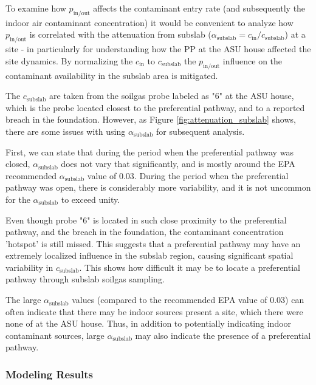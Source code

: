 \documentclass[journal=esthag,manuscript=article]{achemso}
\begin{document}
To examine how $p_\mathrm{in/out}$ affects the contaminant entry rate (and subsequently the indoor air contaminant concentration) it would be convenient to analyze how $p_\mathrm{in/out}$ is correlated with the attenuation from subslab ($\alpha_\mathrm{subslab} = c_\mathrm{in}/c_\mathrm{subslab}$) at a site - in particularly for understanding how the PP at the ASU house affected the site dynamics.
By normalizing the $c_\mathrm{in}$ to $c_\mathrm{subslab}$ the $p_\mathrm{in/out}$ influence on the contaminant availability in the subslab area is mitigated.

The $c_\mathrm{subslab}$ are taken from the soilgas probe labeled as "6" at the ASU house, which is the probe located closest to the preferential pathway, and to a reported breach in the foundation\cite{guo_identification_2015}.
However, as Figure \ref{fig:attenuation_subslab} shows, there are some issues with using $\alpha_\mathrm{subslab}$ for subsequent analysis.

First, we can state that during the period when the preferential pathway was closed, $\alpha_\mathrm{subslab}$ does not vary that significantly, and is mostly around the EPA recommended $\alpha_\mathrm{subslab}$ value of 0.03\cite{u.s._environmental_protection_agency_oswer_2015}.
During the period when the preferential pathway was open, there is considerably more variability, and it is not uncommon for the $\alpha_\mathrm{subslab}$ to exceed unity.

Even though probe "6" is located in such close proximity to the preferential pathway, and the breach in the foundation, the contaminant concentration 'hotspot' is still missed.
This suggests that a preferential pathway may have an extremely localized influence in the subslab region, causing significant spatial variability in $c_\mathrm{subslab}$.
This shows how difficult it may be to locate a preferential pathway through subslab soilgas sampling.

The large $\alpha_\mathrm{subslab}$ values (compared to the recommended EPA value of 0.03) can often indicate that there may be indoor sources present a site, which there were none of at the ASU house.
Thus, in addition to potentially indicating indoor contaminant sources, large $\alpha_\mathrm{subslab}$ may also indicate the presence of a preferential pathway.

\subsubsection{Modeling Results} %
\end{document}
